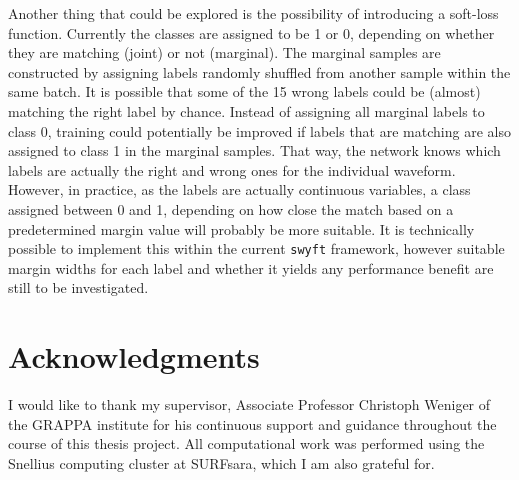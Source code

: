 Another thing that could be explored is the possibility of introducing a soft-loss function. Currently the classes are assigned to be 1 or 0, depending on whether they are matching (joint) or not (marginal). The marginal samples are constructed by assigning labels randomly shuffled from another sample within the same batch. It is possible that some of the 15 wrong labels could be (almost) matching the right label by chance. Instead of assigning all marginal labels to class 0, training could potentially be improved if labels that are matching are also assigned to class 1 in the marginal samples. That way, the network knows which labels are actually the right and wrong ones for the individual waveform. However, in practice, as the labels are actually continuous variables, a class assigned between 0 and 1, depending on how close the match based on a predetermined margin value will probably be more suitable. It is technically possible to implement this within the current \texttt{swyft} framework, however suitable margin widths for each label and whether it yields any performance benefit are still to be investigated.


\section{Acknowledgments}
\label{sec:acknowledgments}

I would like to thank my supervisor, Associate Professor Christoph Weniger of the GRAPPA institute for his continuous support and guidance throughout the course of this thesis project. All computational work was performed using the Snellius computing cluster at SURFsara, which I am also grateful for.




